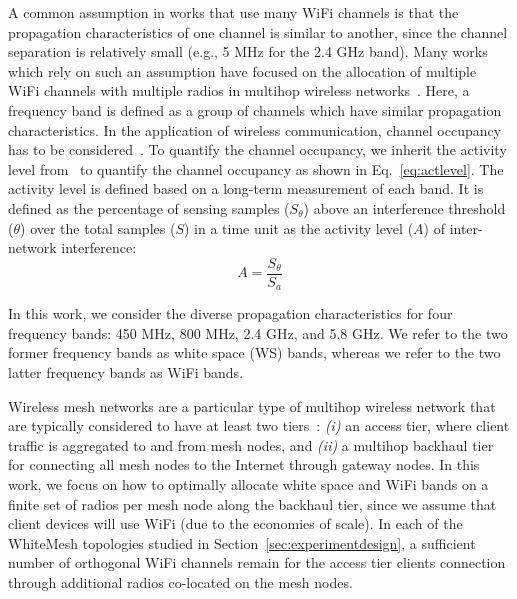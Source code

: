 A common assumption in works that use many WiFi channels is that the
propagation characteristics of one channel is similar to another, 
since the channel separation is relatively small (e.g., 5 MHz for 
the 2.4 GHz band).
Many works which rely on such an assumption have focused on the 
allocation of multiple WiFi channels with multiple radios in 
multihop wireless networks~\cite{si2010overview}.  Here, a frequency 
band is defined as a group of channels which have
similar propagation characteristics.
In the application of wireless communication, channel occupancy has
to be considered~\cite{fallah2010congestion}. To quantify the 
channel occupancy, we inherit the activity level from~\cite{cui2013leveraging}
to quantify the channel occupancy as shown in Eq.~\ref{eq:actlevel}.
The activity level is defined based on a long-term measurement 
of each band.  It is defined as the percentage of sensing samples ($S_\theta$) above an 
interference threshold ($\theta$) over the total samples ($S$) in a time unit as the 
activity level ($A$) of inter-network interference:
\begin{equation}
\label{eq:actlevel}
A=\frac{S_\theta}{S_a}
\end{equation}

In this work, we consider the diverse propagation characteristics
for four frequency bands: 450 MHz, 800 MHz, 2.4 GHz, and 5.8 GHz.
We refer to the two former frequency bands as white space (WS) bands, whereas
we refer to the two latter frequency bands as WiFi bands.

Wireless mesh networks are a particular type of multihop wireless network
that are typically considered to have at least two
tiers~\cite{CRSK06}: {\it (i)} an access tier, where client traffic 
is aggregated to and from mesh nodes, and {\it (ii)} a multihop 
backhaul tier for connecting all mesh nodes to the Internet through 
gateway nodes. In this work, we focus on how to optimally allocate 
white space and WiFi bands on a finite set of radios per mesh node
along the backhaul tier, since we assume that client devices will use 
WiFi (due to the economies of scale).  In each of the WhiteMesh 
topologies studied in Section~\ref{sec:experimentdesign}, a sufficient 
number of orthogonal WiFi channels remain for the access tier 
clients connection through additional radios co-located on the mesh nodes.

